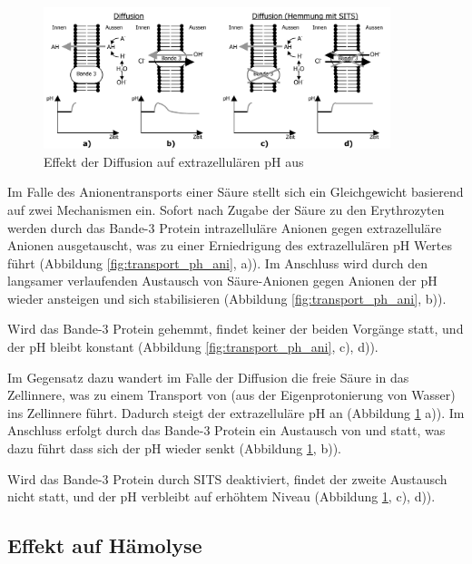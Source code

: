 \documentclass[a4paper,german]{scrreprt}
\begin{document}
\begin{figure}[h]
	\centering
	\includegraphics[width=0.9\textwidth]{img/th_transport_ph_diff}
	\caption{Effekt der Diffusion auf extrazellulären pH aus \cite{skriptv6}}
	\label{fig:transport_ph_diff}
\end{figure}

Im Falle des Anionentransports einer Säure stellt sich ein Gleichgewicht
basierend auf zwei Mechanismen ein. Sofort nach Zugabe der Säure zu den
Erythrozyten werden durch das Bande-3 Protein intrazelluläre  Anionen
gegen extrazelluläre  Anionen ausgetauscht, was zu einer Erniedrigung
des extrazellulären pH Wertes führt (Abbildung \ref{fig:transport_ph_ani}, a)).
Im Anschluss wird durch den langsamer verlaufenden Austausch von Säure-Anionen
gegen  Anionen der pH wieder ansteigen und sich stabilisieren
(Abbildung \ref{fig:transport_ph_ani}, b)).

Wird das Bande-3 Protein gehemmt, findet keiner der beiden Vorgänge statt, und
der pH bleibt konstant (Abbildung \ref{fig:transport_ph_ani}, c), d)).

Im Gegensatz dazu wandert im Falle der Diffusion die freie Säure in das
Zellinnere, was zu einem Transport von  (aus der Eigenprotonierung von
Wasser) ins Zellinnere führt. Dadurch steigt der extrazelluläre pH an
(Abbildung \ref{fig:transport_ph_diff} a)). Im Anschluss erfolgt durch das
Bande-3 Protein ein Austausch von  und  statt, was dazu führt
dass sich der pH wieder senkt (Abbildung \ref{fig:transport_ph_diff}, b)).

Wird das Bande-3 Protein durch SITS deaktiviert, findet der zweite Austausch
nicht statt, und der pH verbleibt auf erhöhtem Niveau (Abbildung
\ref{fig:transport_ph_diff}, c), d)).

\subsection{Effekt auf Hämolyse}
\end{document}
